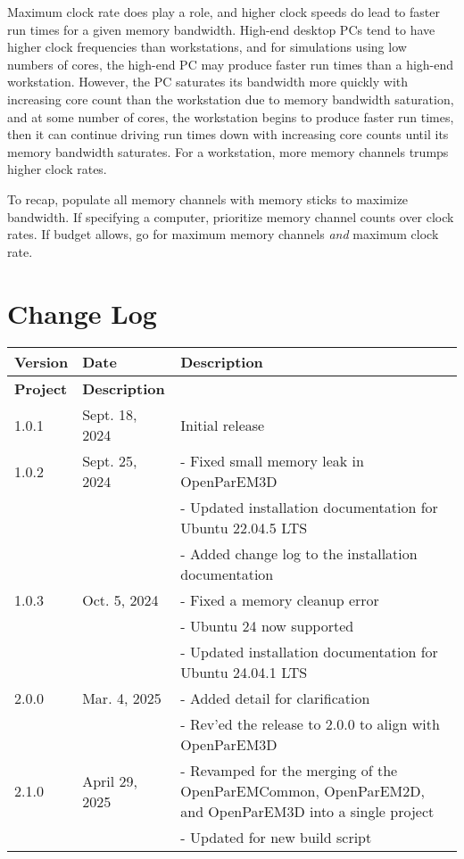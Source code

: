 \documentclass[titlepage]{article}
\renewcommand\_{\textunderscore\linebreak[1]}
\begin{document}
Maximum clock rate does play a role, and higher clock speeds do lead to faster run times for a given memory bandwidth.  High-end desktop PCs tend to have higher clock frequencies than workstations, and for simulations using low numbers of cores, the high-end PC may produce faster run times than a high-end workstation.  However, the PC saturates its bandwidth more quickly with increasing core count than the workstation due to memory bandwidth saturation, and at some number of cores, the workstation begins to produce faster run times, then it can continue driving run times down with increasing core counts until its memory bandwidth saturates.  For a workstation, more memory channels trumps higher clock rates.

To recap, populate all memory channels with memory sticks to maximize bandwidth. If specifying a computer, prioritize memory channel counts over clock rates.  If budget allows, go for maximum memory channels \textit{and} maximum clock rate.

\section{Change Log}

\tabcolsep=0.1cm
\small
\begin{longtable}[c]{|p{1.5cm}p{3cm}p{11cm}|}
    \hline
    \textbf{Version} & \textbf{Date} & Description \\
    \hline
    \endfirsthead
    \hline
    \textbf{Project} & \textbf{Description} \\
    \hline
    \endhead
   1.0.1 & Sept. 18, 2024 & Initial release \\
   1.0.2 & Sept. 25, 2024 & - Fixed small memory leak in OpenParEM3D \\
         &                & - Updated installation documentation for Ubuntu 22.04.5 LTS \\
         &                & - Added change log to the installation documentation \\
   1.0.3 & Oct. 5, 2024   & - Fixed a memory cleanup error \\
         &                & - Ubuntu 24 now supported \\
         &                & - Updated installation documentation for Ubuntu 24.04.1 LTS \\
   2.0.0 & Mar. 4, 2025   & - Added detail for clarification \\
         &                & - Rev'ed the release to 2.0.0 to align with OpenParEM3D \\
   2.1.0 & April 29, 2025   & - Revamped for the merging of the OpenParEMCommon, OpenParEM2D, and OpenParEM3D into a single project \\
         &                & - Updated for new build script \\
    \hline
\end{longtable}
\end{document}
